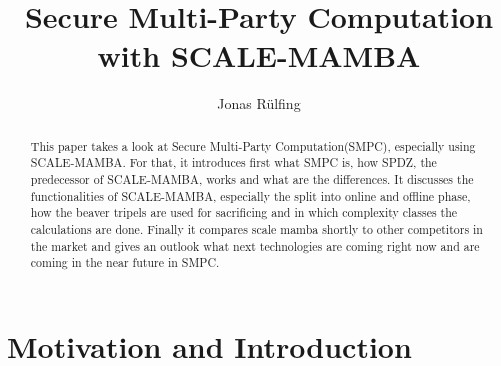 \documentclass[english,runningheads,a4paper]{llncs}[2018/03/10]
\begin{document}
\title{Secure Multi-Party Computation with SCALE-MAMBA}

\author{Jonas Rülfing}

%
%

\maketitle

\begin{abstract}
This paper takes a look at Secure Multi-Party Computation(SMPC), especially using SCALE-MAMBA. For that, it introduces first what SMPC is, how SPDZ, the predecessor of SCALE-MAMBA, works and what are the differences. It discusses the functionalities of SCALE-MAMBA, especially the split into online and offline phase, how the beaver tripels are used for sacrificing and in which complexity classes the calculations are done. Finally it compares scale mamba shortly to other competitors in the market and gives an outlook what next technologies are coming right now and are coming in the near future in SMPC.
\end{abstract}

\section{Motivation and Introduction}\label{sec:intromoti}
\end{document}
